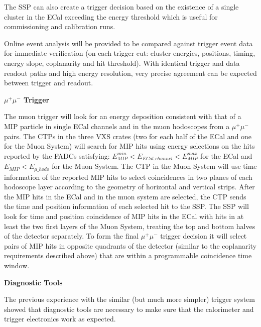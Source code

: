 The SSP can also create a trigger decision based on the existence of a single cluster in the ECal exceeding the energy threshold which is  useful for commissioning and calibration runs. 

Online event analysis will be provided to be compared against trigger event data for immediate verification (on each trigger cut: cluster energies, positions, timing, energy slope, coplanarity and hit threshold). With identical trigger and data readout paths and high energy resolution, very precise agreement can be expected between trigger and readout.




\vspace{1cm}
{\bf $\mu^+\mu^-$ Trigger} 

The muon trigger will look for an energy deposition consistent with that of a MIP particle in single ECal channels and in the muon hodoscopes from a $\mu^+\mu^-$ pairs.  The CTPs in the three VXS crates (two for each half of the ECal and one for the Muon System) will search for MIP hits using energy selections on the hits reported by the FADCs satisfying: $E_{MIP}^{min}<E_{ECal\_channel}<E_{MIP}^{max}$ for the ECal and $E_{MIP}<E_{\mu\_hodo}$ for the Muon System. The CTP in the Muon System will use time information of the reported MIP hits to select coincidences in two planes of each hodoscope layer according to the geometry of horizontal and vertical strips. After the MIP hits in the ECal and in the muon system are selected, the CTP sends the time and position information of each selected hit to the SSP. The SSP will look for time and position coincidence of MIP hits in the ECal with hits in at least the two first layers of the Muon System, treating the top and bottom halves of the detector separately. To form the final $\mu^+\mu^-$ trigger decision it will select pairs of MIP hits in opposite quadrants of the detector (similar to the coplanarity requirements described above) that are within a programmable coincidence time window. 



\vspace{1cm}
{\bf Diagnostic Tools}

The previous experience with the similar (but much more simpler) trigger system showed that diagnostic tools are necessary to make sure that the calorimeter and trigger electronics work as expected. 

